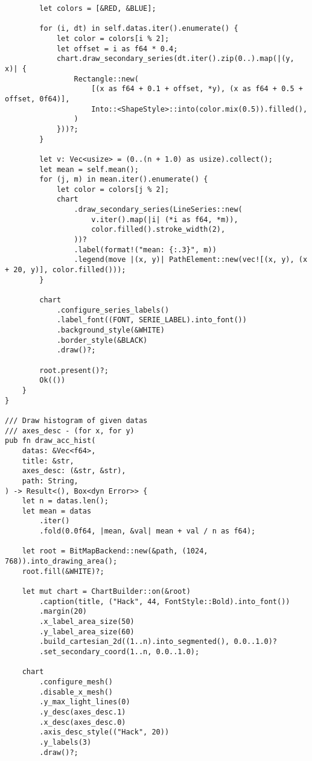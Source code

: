 \begin{code}
\begin{verbatim}
        let colors = [&RED, &BLUE];

        for (i, dt) in self.datas.iter().enumerate() {
            let color = colors[i % 2];
            let offset = i as f64 * 0.4;
            chart.draw_secondary_series(dt.iter().zip(0..).map(|(y, x)| {
                Rectangle::new(
                    [(x as f64 + 0.1 + offset, *y), (x as f64 + 0.5 + offset, 0f64)],
                    Into::<ShapeStyle>::into(color.mix(0.5)).filled(),
                )
            }))?;
        }

        let v: Vec<usize> = (0..(n + 1.0) as usize).collect();
        let mean = self.mean();
        for (j, m) in mean.iter().enumerate() {
            let color = colors[j % 2];
            chart
                .draw_secondary_series(LineSeries::new(
                    v.iter().map(|i| (*i as f64, *m)),
                    color.filled().stroke_width(2),
                ))?
                .label(format!("mean: {:.3}", m))
                .legend(move |(x, y)| PathElement::new(vec![(x, y), (x + 20, y)], color.filled()));
        }

        chart
            .configure_series_labels()
            .label_font((FONT, SERIE_LABEL).into_font())
            .background_style(&WHITE)
            .border_style(&BLACK)
            .draw()?;

        root.present()?;
        Ok(())
    }
}

/// Draw histogram of given datas
/// axes_desc - (for x, for y)
pub fn draw_acc_hist(
    datas: &Vec<f64>,
    title: &str,
    axes_desc: (&str, &str),
    path: String,
) -> Result<(), Box<dyn Error>> {
    let n = datas.len();
    let mean = datas
        .iter()
        .fold(0.0f64, |mean, &val| mean + val / n as f64);

    let root = BitMapBackend::new(&path, (1024, 768)).into_drawing_area();
    root.fill(&WHITE)?;

    let mut chart = ChartBuilder::on(&root)
        .caption(title, ("Hack", 44, FontStyle::Bold).into_font())
        .margin(20)
        .x_label_area_size(50)
        .y_label_area_size(60)
        .build_cartesian_2d((1..n).into_segmented(), 0.0..1.0)?
        .set_secondary_coord(1..n, 0.0..1.0);

    chart
        .configure_mesh()
        .disable_x_mesh()
        .y_max_light_lines(0)
        .y_desc(axes_desc.1)
        .x_desc(axes_desc.0)
        .axis_desc_style(("Hack", 20))
        .y_labels(3)
        .draw()?;


\end{verbatim}
\end{code}
